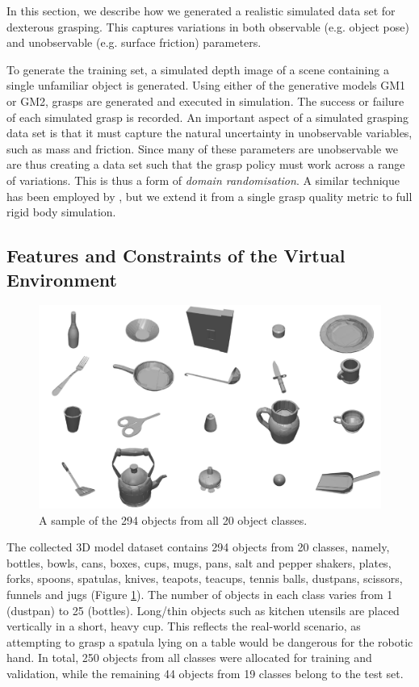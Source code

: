 In this section, we describe how we generated a realistic simulated data set for dexterous grasping. This captures variations in both observable (e.g. object pose) and unobservable (e.g. surface friction) parameters.

To generate the training set, a simulated depth image of a scene containing a single unfamiliar object is generated. Using either of the generative models GM1 or GM2, grasps are generated and executed in simulation. The success or failure of each simulated grasp is recorded. An important aspect of a simulated grasping data set is that it must capture the natural uncertainty in unobservable variables, such as mass and friction. Since many of these parameters are unobservable we are thus creating a data set such that the grasp policy must work across a range of variations. This is thus a form of {\em domain randomisation}. A similar technique has been employed by \cite{mahler2017dex}, but we extend it from a single grasp quality metric to full rigid body simulation.

\subsection{Features and Constraints of the Virtual Environment}
\label{subsection:environment}

\begin{figure}[t]
\begin{center}
  \includegraphics[width=0.7\columnwidth]{images/allObjects-small.pdf}
  \end{center}
  \caption{A sample of the 294 objects from all 20 object classes.
  \label{fig:allObjects}}
\end{figure}

The collected 3D model dataset contains 294 objects from 20 classes, namely, bottles, bowls, cans, boxes, cups, mugs, pans, salt and pepper shakers, plates, forks, spoons, spatulas, knives, teapots, teacups, tennis balls, dustpans, scissors, funnels and jugs (Figure \ref{fig:allObjects}). The number of objects in each class varies from 1 (dustpan) to 25 (bottles). Long/thin objects such as kitchen utensils are placed vertically in a short, heavy cup. This reflects the real-world scenario, as attempting to grasp a spatula lying on a table would be dangerous for the robotic hand. In total, 250 objects from all classes were allocated for training and validation, while the remaining 44 objects from 19 classes belong to the test set.

